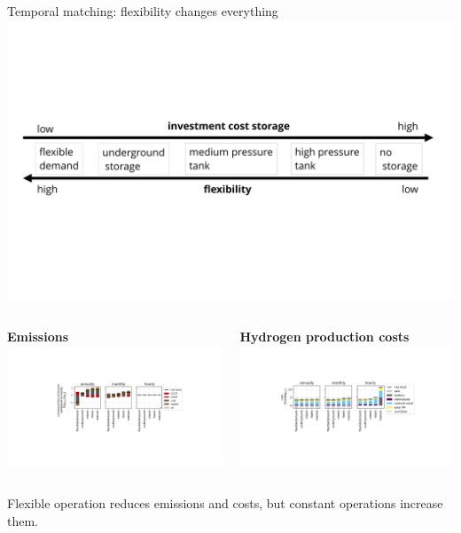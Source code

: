 \begin{frame}{Temporal matching: flexibility changes everything}
	\centering
	\includegraphics[width=0.6\linewidth, clip, trim={0cm 5cm 0cm 5cm}]{images/store_flexibility_v2}
	\begin{columns}[t]
		\begin{column}{0.5\textwidth}
			  	\centering
			\textbf{Emissions} \\
  	\includegraphics[width=1\linewidth, clip, trim={5cm 4cm 5cm 4cm}]{images/emissions_flexibility}
  	\end{column}
\begin{column}{0.5\textwidth}
		\centering
	\textbf{Hydrogen production costs} \\
	\includegraphics[width=1\linewidth, clip, trim={5cm 4cm 5cm 4cm}]{images/costs_flexibility}
\end{column}
\end{columns}
	\centering
    \alert{Flexible} operation \alert{reduces} emissions and costs, but \alert{constant} operations \alert{increase} them.
    

\end{frame}

